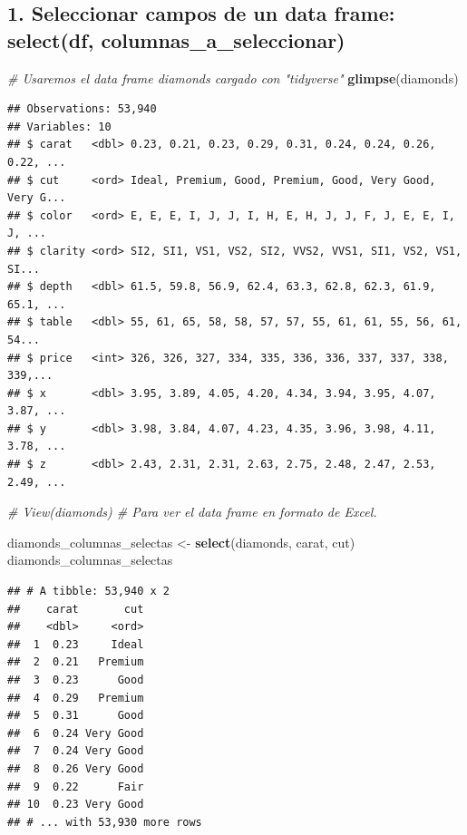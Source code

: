 \documentclass[]{book}
\newenvironment{Shaded}{\begin{snugshade}}{\end{snugshade}}
\newcommand{\KeywordTok}[1]{\textcolor[rgb]{0.13,0.29,0.53}{\textbf{#1}}}
\newcommand{\StringTok}[1]{\textcolor[rgb]{0.31,0.60,0.02}{#1}}
\newcommand{\CommentTok}[1]{\textcolor[rgb]{0.56,0.35,0.01}{\textit{#1}}}
\newcommand{\NormalTok}[1]{#1}
\theoremstyle{definition}
\theoremstyle{definition}
\theoremstyle{definition}
\theoremstyle{remark}
\begin{document}
\subsection{1. Seleccionar campos de un data frame: select(df,
columnas\_a\_seleccionar)}\label{seleccionar-campos-de-un-data-frame-selectdf-columnas_a_seleccionar}

\begin{Shaded}
\begin{Highlighting}[]
\CommentTok{# Usaremos el data frame diamonds cargado con "tidyverse"}
\KeywordTok{glimpse}\NormalTok{(diamonds)}
\end{Highlighting}
\end{Shaded}

\begin{verbatim}
## Observations: 53,940
## Variables: 10
## $ carat   <dbl> 0.23, 0.21, 0.23, 0.29, 0.31, 0.24, 0.24, 0.26, 0.22, ...
## $ cut     <ord> Ideal, Premium, Good, Premium, Good, Very Good, Very G...
## $ color   <ord> E, E, E, I, J, J, I, H, E, H, J, J, F, J, E, E, I, J, ...
## $ clarity <ord> SI2, SI1, VS1, VS2, SI2, VVS2, VVS1, SI1, VS2, VS1, SI...
## $ depth   <dbl> 61.5, 59.8, 56.9, 62.4, 63.3, 62.8, 62.3, 61.9, 65.1, ...
## $ table   <dbl> 55, 61, 65, 58, 58, 57, 57, 55, 61, 61, 55, 56, 61, 54...
## $ price   <int> 326, 326, 327, 334, 335, 336, 336, 337, 337, 338, 339,...
## $ x       <dbl> 3.95, 3.89, 4.05, 4.20, 4.34, 3.94, 3.95, 4.07, 3.87, ...
## $ y       <dbl> 3.98, 3.84, 4.07, 4.23, 4.35, 3.96, 3.98, 4.11, 3.78, ...
## $ z       <dbl> 2.43, 2.31, 2.31, 2.63, 2.75, 2.48, 2.47, 2.53, 2.49, ...
\end{verbatim}

\begin{Shaded}
\begin{Highlighting}[]
\CommentTok{# View(diamonds) # Para ver el data frame en formato de Excel.}

\NormalTok{diamonds_columnas_selectas <-}\StringTok{ }\KeywordTok{select}\NormalTok{(diamonds, carat, cut)}
\NormalTok{diamonds_columnas_selectas}
\end{Highlighting}
\end{Shaded}

\begin{verbatim}
## # A tibble: 53,940 x 2
##    carat       cut
##    <dbl>     <ord>
##  1  0.23     Ideal
##  2  0.21   Premium
##  3  0.23      Good
##  4  0.29   Premium
##  5  0.31      Good
##  6  0.24 Very Good
##  7  0.24 Very Good
##  8  0.26 Very Good
##  9  0.22      Fair
## 10  0.23 Very Good
## # ... with 53,930 more rows
\end{verbatim}
\end{document}
